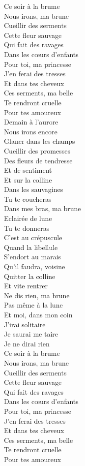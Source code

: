 \documentclass{novel}
\begin{document}
\begin{multicols}{2}
Ce soir à la brume \\
Nous irons, ma brune \\
Cueillir des serments \\
Cette fleur sauvage \\
Qui fait des ravages \\
Dans les cœurs d'enfants \\
Pour toi, ma princesse \\
J'en ferai des tresses \\
Et dans tes cheveux \\
Ces serments, ma belle \\
Te rendront cruelle \\
Pour tes amoureux \\

Demain à l'aurore \\
Nous irons encore \\
Glaner dans les champs \\
Cueillir des promesses \\
Des fleurs de tendresse \\
Et de sentiment \\
Et sur la colline \\
Dans les sauvagines \\
Tu te coucheras \\
Dans mes bras, ma brune \\
Eclairée de lune \\
Tu te donneras \\

C'est au crépuscule \\
Quand la libellule \\
S'endort au marais \\
Qu'il faudra, voisine \\
Quitter la colline \\
Et vite rentrer \\
Ne dis rien, ma brune \\
Pas même à la lune \\
Et moi, dans mon coin \\
J'irai solitaire \\
Je saurai me taire \\
Je ne dirai rien \\

Ce soir à la brume \\
Nous irons, ma brune \\
Cueillir des serments \\
Cette fleur sauvage \\
Qui fait des ravages \\
Dans les cœurs d'enfants \\
Pour toi, ma princesse \\
J'en ferai des tresses \\
Et dans tes cheveux \\
Ces serments, ma belle \\
Te rendront cruelle \\
Pour tes amoureux
\end{multicols}
\end{document}
